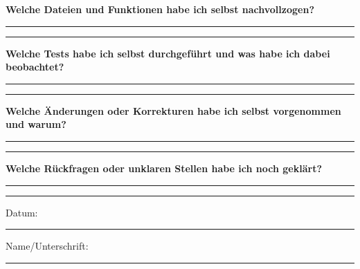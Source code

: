 \documentclass[11pt,a4paper]{article}
\begin{document}
\textbf{Welche Dateien und Funktionen habe ich selbst nachvollzogen?}
\vspace{26mm}\hrule\vspace{14mm}\hrule
\vspace{7mm}
\textbf{Welche Tests habe ich selbst durchgeführt und was habe ich dabei beobachtet?}
\vspace{26mm}\hrule\vspace{14mm}\hrule
\vspace{7mm}
\textbf{Welche Änderungen oder Korrekturen habe ich selbst vorgenommen und warum?}
\vspace{26mm}\hrule\vspace{14mm}\hrule
\vspace{7mm}
\textbf{Welche Rückfragen oder unklaren Stellen habe ich noch geklärt?}
\vspace{23mm}\hrule\vspace{14mm}\hrule
\vspace{8mm}
Datum: \rule{42mm}{0.4pt}\hfill Name/Unterschrift: \rule{58mm}{0.4pt}
\end{document}
